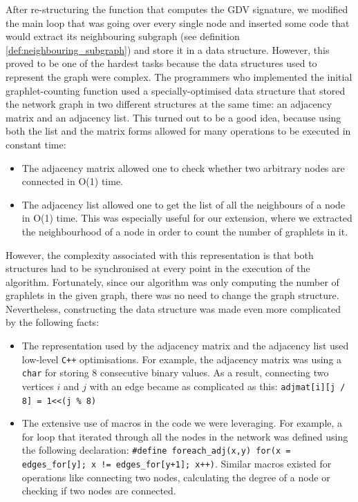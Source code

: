After re-structuring the function that computes the GDV signature, we modified the main loop that was going over every single node and inserted some code that would extract its neighbouring subgraph (see definition \ref{def:neighbouring_subgraph}) and store it in a data structure. However, this proved to be one of the hardest tasks because the data structures used to represent the graph were complex. The programmers who implemented the initial graphlet-counting function used a specially-optimised data structure that stored the network graph in two different structures at the same time: an adjacency matrix and an adjacency list. This turned out to be a good idea, because using both the list and the matrix forms allowed for many operations to be executed in constant time:
\begin{itemize}
 \item The adjacency matrix allowed one to check whether two arbitrary nodes are connected in O(1) time.
 \item The adjacency list allowed one to get the list of all the neighbours of a node in O(1) time. This was especially useful for our extension, where we extracted the neighbourhood of a node in order to count the number of graphlets in it. 
\end{itemize}

However, the complexity associated with this representation is that both structures had to be synchronised at every point in the execution of the algorithm. Fortunately, since our algorithm was only computing the number of graphlets in the given graph, there was no need to change the graph structure. Nevertheless, constructing the data structure was made even more complicated by the following facts:
\begin{itemize}
 \item The representation used by the adjacency matrix and the adjacency list used low-level \verb!C++! optimisations. For example, the adjacency matrix was using a \lstinline|char| for storing 8 consecutive binary values. As a result, connecting two vertices $i$ and $j$ with an edge became as complicated as this: \lstinline|adjmat[i][j / 8] = 1<<(j % 8)| %
 \item The extensive use of macros in the code we were leveraging. For example, a for loop that iterated through all the nodes in the network was defined using the following declaration: \lstinline|#define foreach_adj(x,y) for(x = edges_for[y]; x != edges_for[y+1]; x++)|. Similar macros existed for operations like connecting two nodes, calculating the degree of a node or checking if two nodes are connected.
\end{itemize}

